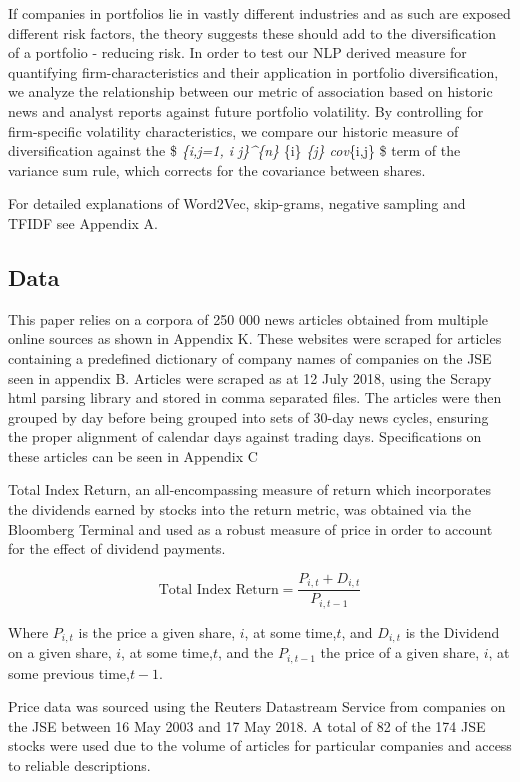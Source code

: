 \documentclass[11pt]{article}
\begin{document}
If companies in portfolios lie in vastly different industries and as
such are exposed different risk factors, the theory suggests these
should add to the diversification of a portfolio - reducing risk. In
order to test our NLP derived measure for quantifying
firm-characteristics and their application in portfolio diversification,
we analyze the relationship between our metric of association based on
historic news and analyst reports against future portfolio volatility.
By controlling for firm-specific volatility characteristics, we compare
our historic measure of diversification against the \$
\sum\emph{\{i,j=1, i \ne j\}\^{}\{n\} \sigma}\{i\} \sigma\emph{\{j\}
cov}\{i,j\} \$ term of the variance sum rule, which corrects for the
covariance between shares.

For detailed explanations of Word2Vec, skip-grams, negative sampling and
TFIDF see Appendix A.

\hypertarget{data}{%
\subsection{Data}\label{data}}

This paper relies on a corpora of 250 000 news articles obtained from
multiple online sources as shown in Appendix K. These websites were
scraped for articles containing a predefined dictionary of company names
of companies on the JSE seen in appendix B. Articles were scraped as at
12 July 2018, using the Scrapy html parsing library and stored in comma
separated files. The articles were then grouped by day before being
grouped into sets of 30-day news cycles, ensuring the proper alignment
of calendar days against trading days. Specifications on these articles
can be seen in Appendix C

Total Index Return, an all-encompassing measure of return which
incorporates the dividends earned by stocks into the return metric, was
obtained via the Bloomberg Terminal and used as a robust measure of
price in order to account for the effect of dividend payments.

\[ \text{Total Index Return} = \frac{P_{i,t} + D_{i,t}}{P_{i, t-1}} \]

Where \(P_{i,t}\) is the price a given share, \(i\), at some time,\(t\),
and \(D_{i,t}\) is the Dividend on a given share, \(i\), at some
time,\(t\), and the \(P_{i, t-1}\) the price of a given share, \(i\), at
some previous time,\(t-1\).

Price data was sourced using the Reuters Datastream Service from
companies on the JSE between 16 May 2003 and 17 May 2018. A total of 82
of the 174 JSE stocks were used due to the volume of articles for
particular companies and access to reliable descriptions.
\end{document}
